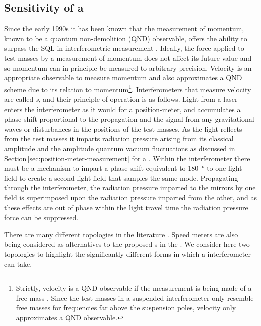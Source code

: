 \subsection{\label{sec:speed-meter-measurement}Sensitivity of a \SM{}}
Since the early 1990s it has been known that the measurement of momentum, known to be a quantum non-demolition (\gls{QND}) observable, offers the ability to surpass the \gls{SQL} in interferometric measurement \cite{Braginsky1990}. Ideally, the force applied to test masses by a measurement of momentum does not affect its future value and so momentum can in principle be measured to arbitrary precision. Velocity is an appropriate observable to measure momentum and also approximates a \gls{QND} scheme due to its relation to momentum\footnote{Strictly, velocity is a \gls{QND} observable if the measurement is being made of a free mass \cite{Danilishin2012}. Since the test masses in a suspended interferometer only resemble free masses for frequencies far above the suspension poles, velocity only approximates a \gls{QND} observable.}. Interferometers that measure velocity are called \emph{\SM{}s}, and their principle of operation is as follows. Light from a laser enters the interferometer as it would for a position-meter, and accumulates a phase shift proportional to the propagation and the signal from any gravitational waves or disturbances in the positions of the test masses. As the light reflects from the test masses it imparts radiation pressure arising from its classical amplitude and the amplitude quantum vacuum fluctuations as discussed in Section\,\ref{sec:position-meter-measurement} for a \FPMI{}. Within the interferometer there must be a mechanism to impart a phase shift equivalent to \SI{180}{\degree} to one light field to create a second light field that samples the same mode. Propagating through the interferometer, the radiation pressure imparted to the mirrors by one field is superimposed upon the radiation pressure imparted from the other, and as these effects are out of phase within the light travel time the radiation pressure force can be suppressed.

There are many different \SM{} topologies in the literature \cite{Danilishin2004, Wang2013, Huttner2016, Wade2012}. Speed meters are also being considered as alternatives to the proposed \MI{}s in the \ET{} \cite{MuellerEbhardt2009a, Voronchev2015}. We consider here two \SM{} topologies to highlight the significantly different forms in which a \SM{} interferometer can take.

